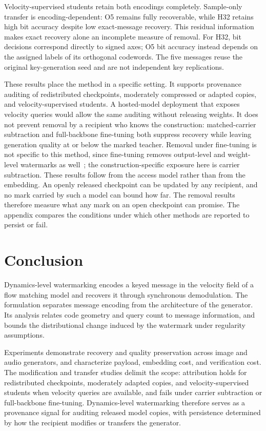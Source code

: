 \documentclass[11pt]{article}
\begin{document}
Velocity-supervised students retain both encodings completely.
Sample-only transfer is encoding-dependent: O5 remains fully
recoverable, while H32 retains high bit accuracy despite low
exact-message recovery. This residual information makes exact recovery
alone an incomplete measure of removal. For H32, bit decisions
correspond directly to signed axes; O5 bit accuracy instead depends on
the assigned labels of its orthogonal codewords. The five messages
reuse the original key-generation seed and are not independent key
replications.

These results place the method in a specific setting. It supports
provenance auditing of redistributed checkpoints, moderately compressed
or adapted copies, and velocity-supervised students. A hosted-model deployment that exposes velocity queries would allow the same auditing without releasing weights. It does not prevent removal by a recipient who knows the construction: matched-carrier subtraction and full-backbone fine-tuning both suppress recovery while leaving
generation quality at or below the marked teacher. Removal under
fine-tuning is not specific to this method, since fine-tuning removes
output-level and weight-level watermarks as well~\cite{hu2024unstable}; the construction-specific exposure here is carrier subtraction. These results follow from the access model rather than from the
embedding. An openly released checkpoint can be updated by any
recipient, and no mark carried by such a model can bound how far.
The removal results therefore measure what any mark on an open
checkpoint can promise. The appendix compares the conditions under which other methods are reported to persist or fail.

\FloatBarrier
\section{Conclusion}

Dynamics-level watermarking encodes a keyed message in the velocity
field of a flow matching model and recovers it through synchronous
demodulation. The formulation separates message encoding from the
architecture of the generator. Its analysis relates code geometry and
query count to message information, and bounds the distributional
change induced by the watermark under regularity assumptions.

Experiments demonstrate recovery and quality preservation across image
and audio generators, and characterize payload, embedding cost, and
verification cost. The modification and transfer studies delimit the
scope: attribution holds for redistributed checkpoints, moderately
adapted copies, and velocity-supervised students when velocity queries
are available, and fails under carrier subtraction or full-backbone
fine-tuning. Dynamics-level watermarking therefore serves as a
provenance signal for auditing released model copies, with persistence
determined by how the recipient modifies or transfers the generator.
\end{document}
